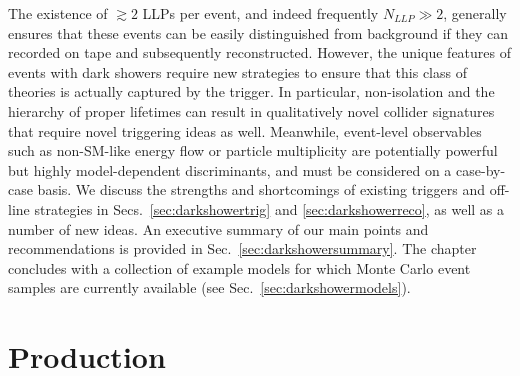 The existence of $\gtrsim 2$ LLPs per event, and indeed frequently $N_{LLP}\gg 2$, generally ensures that these events can be easily distinguished from background if they can recorded on tape and subsequently reconstructed. However, the unique features of events with dark showers require new strategies to ensure that this class of theories is actually captured by the trigger. In particular, non-isolation and the hierarchy of proper lifetimes can result in qualitatively novel collider signatures that require novel triggering ideas as well. Meanwhile, event-level observables such as non-SM-like energy flow or particle multiplicity are potentially powerful but highly model-dependent discriminants, and must be considered on a case-by-case basis. We discuss the strengths and shortcomings of existing triggers and off-line strategies in Secs.~\ref{sec:darkshowertrig} and \ref{sec:darkshowerreco}, as well as a number of new ideas. An executive summary of our main points and recommendations is provided in Sec.~\ref{sec:darkshowersummary}. The chapter concludes with a collection of example models for which Monte Carlo event samples are currently available (see Sec.~\ref{sec:darkshowermodels}).

\section{Production}
\label{sec:darkshowerprod}

